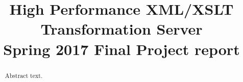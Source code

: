 


\title{
	High Performance XML/XSLT Transformation Server \\
    {
    	\LARGE Spring 2017 Final Project report
    }
}
\author{
}



\maketitle
\begin{abstract}
  Abstract text.
\end{abstract}





















